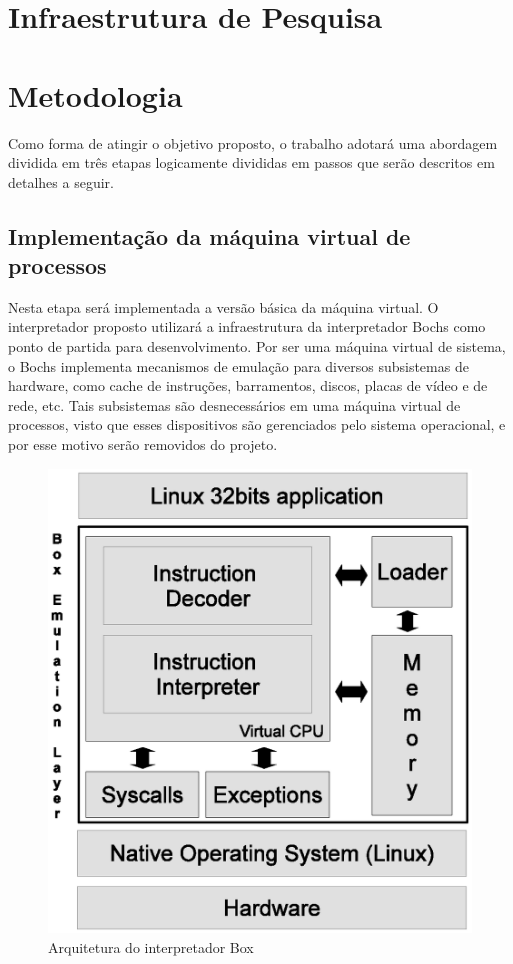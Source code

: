 \documentclass[11pt,twoside]{article}
\begin{document}
\section{Infraestrutura de Pesquisa}
%

\section{Metodologia}

Como forma de atingir o objetivo proposto, o trabalho adotará uma abordagem dividida em três etapas logicamente divididas em passos que serão descritos em detalhes a seguir.

\subsection{Implementação da máquina virtual de processos}

Nesta etapa será implementada a versão básica da máquina virtual.
O interpretador proposto utilizará a infraestrutura da interpretador Bochs como ponto de partida para desenvolvimento. 
Por ser uma máquina virtual de sistema, o Bochs implementa mecanismos de emulação para diversos subsistemas de hardware, como cache de instruções, barramentos, discos, placas de vídeo e de rede, etc.
Tais subsistemas são desnecessários em uma máquina virtual de processos, visto que esses dispositivos são gerenciados pelo sistema operacional, e por esse motivo serão removidos do projeto.

\begin{figure}[h]
 \centering
 \includegraphics[width=0.5\columnwidth]{./figures/box-architecture.eps}
 \caption{Arquitetura do interpretador Box}
 \label{fig:box-architecture}
\end{figure}
\end{document}
